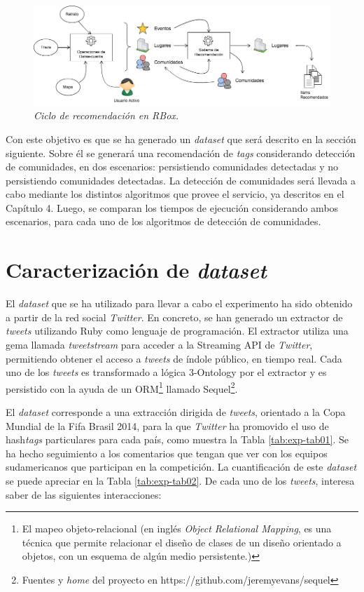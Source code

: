 \begin{figure}
  \centering
  \includegraphics[scale=.6]{images/Figura5-1}
  \caption{\em Ciclo de recomendación en RBox.}
  \label{fig:exp-im1}
\end{figure}

Con este objetivo es que se ha generado un \textit{data\textit{set}} que será descrito en la sección siguiente. Sobre él se generará una recomendación de \textit{tags} considerando detección de comunidades, en dos escenarios: persistiendo comunidades detectadas y no persistiendo comunidades detectadas. La detección de comunidades será llevada a cabo mediante los distintos algoritmos que provee el servicio, ya descritos en el Capítulo 4. Luego, se comparan los tiempos de ejecución considerando ambos escenarios, para cada uno de los algoritmos de detección de comunidades.

\section{Caracterización de \textit{data\textit{set}}}

El \textit{data\textit{set}} que se ha utilizado para llevar a cabo el experimento ha sido obtenido a partir de la red social \textit{Twitter}. En concreto, se han generado un extractor de \textit{tweets} utilizando Ruby como lenguaje de programación. El extractor utiliza una gema llamada \textit{\textit{tweets}tream} para acceder a la Streaming API de \textit{Twitter}, permitiendo obtener el acceso a \textit{tweets} de índole público, en tiempo real. Cada uno de los \textit{tweets} es transformado a lógica 3-Ontology por el extractor y es persistido con la ayuda de un ORM\footnote{El mapeo objeto-relacional (en inglés \textit{Object Relational Mapping}, es una técnica que permite relacionar el diseño de clases de un diseño orientado a objetos, con un esquema de algún medio persistente.)} llamado Sequel\footnote{Fuentes y \textit{home} del proyecto en https://github.com/jeremyevans/sequel}.

El \textit{data\textit{set}} corresponde a una extracción dirigida de \textit{tweets}, orientado a la Copa Mundial de la Fifa Brasil 2014, para la que \textit{Twitter} ha promovido el uso de hash\textit{tags} particulares para cada país, como muestra la Tabla \ref{tab:exp-tab01}. Se ha hecho seguimiento a los comentarios que tengan que ver con los equipos sudamericanos que participan en la competición. La cuantificación de este \textit{data\textit{set}} se puede apreciar en la Tabla \ref{tab:exp-tab02}.  De cada uno de los \textit{tweets}, interesa saber de las siguientes interacciones:

